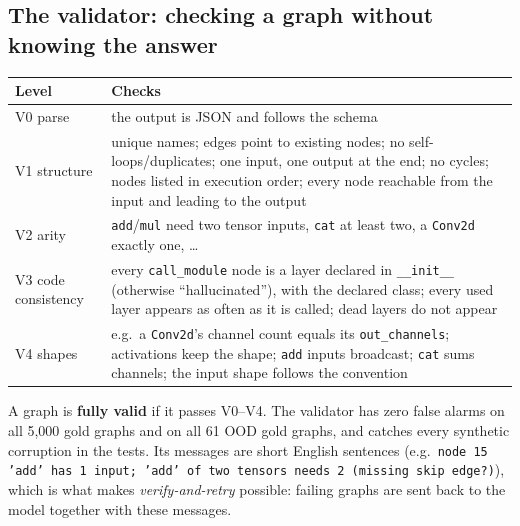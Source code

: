 \documentclass[11pt,a4paper]{article}
\begin{document}
\subsection{The validator: checking a graph without knowing the answer}
\begin{center}\small
\begin{tabular}{lp{12.5cm}}\toprule
Level & Checks \\\midrule
V0 parse & the output is JSON and follows the schema \\
V1 structure & unique names; edges point to existing nodes; no self-loops/duplicates; one input, one output at the end; no cycles; nodes listed in execution order; every node reachable from the input and leading to the output \\
V2 arity & \texttt{add}/\texttt{mul} need two tensor inputs, \texttt{cat} at least two, a \texttt{Conv2d} exactly one, \dots \\
V3 code consistency & every \texttt{call\_module} node is a layer declared in \texttt{\_\_init\_\_} (otherwise ``hallucinated''), with the declared class; every used layer appears as often as it is called; dead layers do not appear \\
V4 shapes & e.g.\ a \texttt{Conv2d}'s channel count equals its \texttt{out\_channels}; activations keep the shape; \texttt{add} inputs broadcast; \texttt{cat} sums channels; the input shape follows the convention \\\bottomrule
\end{tabular}
\end{center}
A graph is \textbf{fully valid} if it passes V0--V4. The validator has zero false alarms on all 5{,}000 gold graphs and on
all 61 OOD gold graphs, and catches every synthetic corruption in the tests. Its messages are short English sentences
(e.g.\ \texttt{node 15 'add' has 1 input; 'add' of two tensors needs 2 (missing skip edge?)}), which is what makes
\emph{verify-and-retry} possible: failing graphs are sent back to the model together with these messages.
\end{document}
